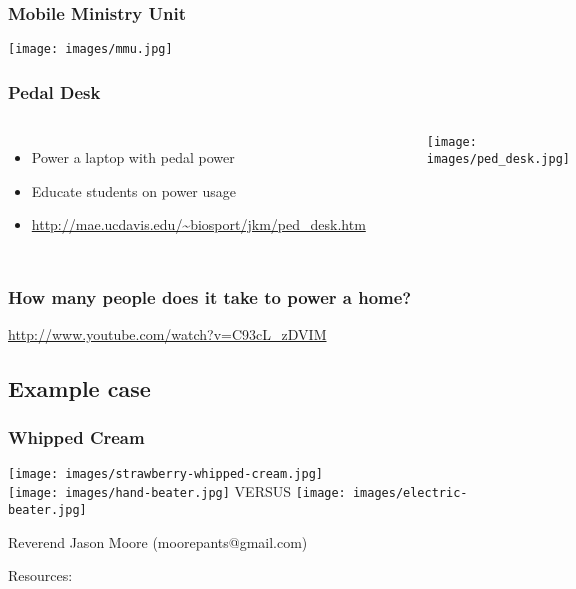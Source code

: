 \documentclass[]{beamer}
\begin{document}
\frame
{
    \frametitle{Mobile Ministry Unit}
    \begin{center}
			\texttt{[image: images/mmu.jpg]}
    \end{center}
}
\frame
{
    \frametitle{Pedal Desk}
    \begin{columns}[t]
        \column{6cm}
        \begin{itemize}
            \item Power a laptop with pedal power
            \item Educate students on power usage
						\item \url{http://mae.ucdavis.edu/~biosport/jkm/ped_desk.htm}
        \end{itemize}
        \column{5cm}
        \begin{center}
        \begin{figure}[]
            \texttt{[image: images/ped\_desk.jpg]}
        \end{figure}
        \end{center}
    \end{columns}
}
\frame
{
    \frametitle{How many people does it take to power a home?}
    \url{http://www.youtube.com/watch?v=C93cL_zDVIM}
}
\subsection{Example case}
\frame
{
    \frametitle{Whipped Cream}
		\begin{center}
			\texttt{[image: images/strawberry-whipped-cream.jpg]}
			\\
			\texttt{[image: images/hand-beater.jpg]}
			\large{VERSUS}
			\texttt{[image: images/electric-beater.jpg]}
		\end{center}
}
\begin{frame}[shrink=30]
	\begin{center}
		\alert{Reverend Jason Moore (moorepants@gmail.com)}\\
	\end{center}
	Resources:
	\nocite{McCullagh1977}
	\nocite{Wilson1986}
	\nocite{Wilson2004}
	\nocite{Dean2008}
	\nocite{Jansen2011}

	
	\small
\end{frame}
\end{document}
